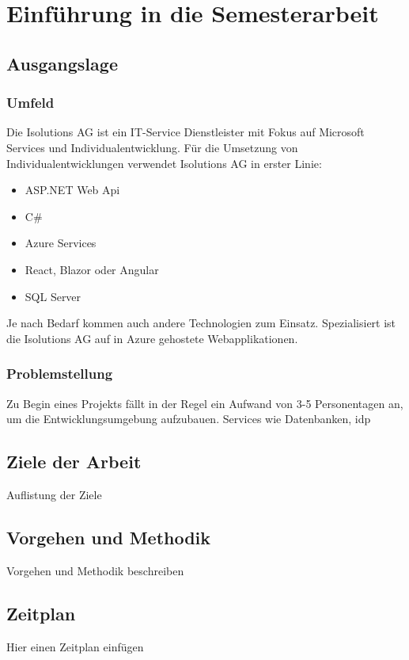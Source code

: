 \section{Einführung in die Semesterarbeit}
    \subsection{Ausgangslage}
        \subsubsection{Umfeld}
            Die Isolutions AG ist ein IT-Service Dienstleister mit Fokus auf Microsoft Services und Individualentwicklung. Für die Umsetzung von Individualentwicklungen verwendet Isolutions AG in erster Linie:
            \begin{itemize}
                \item ASP.NET Web Api
                \item C\#
                \item Azure Services
                \item React, Blazor oder Angular
                \item SQL Server
            \end{itemize}
            Je nach Bedarf kommen auch andere Technologien zum Einsatz. Spezialisiert ist die Isolutions AG auf in Azure gehostete Webapplikationen.

        \subsubsection{Problemstellung}
            Zu Begin eines Projekts fällt in der Regel ein Aufwand von 3-5 Personentagen an, um die Entwicklungsumgebung aufzubauen. Services wie Datenbanken, \Gls{idp}

\subsection{Ziele der Arbeit}
Auflistung der Ziele

\subsection{Vorgehen und Methodik}
Vorgehen und Methodik beschreiben

\subsection{Zeitplan}
Hier einen Zeitplan einfügen
